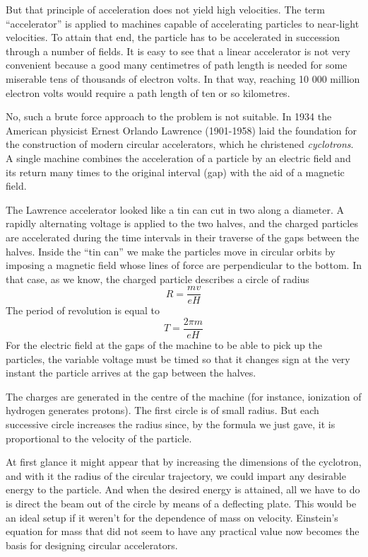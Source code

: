 But that principle of acceleration does not yield high velocities. The term ``accelerator'' is applied to machines capable of accelerating particles to near-light velocities. To attain that end, the particle has to be accelerated in succession through a number of fields. It is easy to see that a linear accelerator is not very convenient because a good many centimetres of path length is needed for some miserable tens of thousands of electron volts. In that way, reaching 10 000 million electron volts would require a path length of ten or so kilometres.

No, such a brute force approach to the problem is not suitable. In 1934 the American physicist Ernest Orlando Lawrence (1901-1958) laid the foundation for the construc­tion of modern circular accelerators, which he christened \emph{cyclotrons}. A single machine combines the acceleration of a particle by an electric field and its return many times to the original interval (gap) with the aid of a magnetic field.

The Lawrence accelerator looked like a tin can cut in two along a diameter. A rapidly alternating voltage is applied to the two halves, and the charged particles are accelerated during the time intervals in their traverse of the gaps between the halves. Inside the ``tin can'' we make the particles move in circular orbits by imposing a mag­netic field whose lines of force are perpendicular to the bottom. In that case, as we know, the charged particle describes a circle of radius
\begin{equation*}%
R = \frac{mv}{eH}
\end{equation*}
The period of revolution is equal to
\begin{equation*}%
T = \frac{2 \pi m}{eH}
\end{equation*}
For the electric field at the gaps of the machine to be able to pick up the particles, the variable voltage must be timed so that it changes sign at the very instant the particle arrives at the gap between the halves.

The charges are generated in the centre of the machine (for instance, ionization of hydrogen generates protons). The first circle is of small radius. But each successive circle increases the radius since, by the formula we just gave, it is proportional to the velocity of the particle.

At first glance it might appear that by increasing the dimensions of the cyclotron, and with it the radius of the circular trajectory, we could impart any desirable energy to the particle. And when the desired energy is attained, all we have to do is direct the beam out of the circle by means of a deflecting plate. This would be an ideal setup if it weren't for the dependence of mass on velocity. Einstein's equation for mass that did not seem to have any practical value now becomes the basis for designing circular accelerators.

